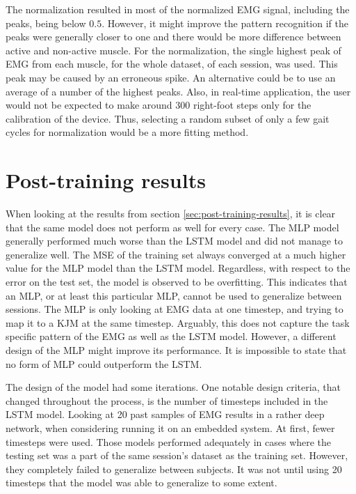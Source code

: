 \documentclass[../main.tex]{subfiles}
\begin{document}
The normalization resulted in most of the normalized \ac{EMG} signal, including the peaks, being below $0.5$.
However, it might improve the pattern recognition if the peaks were generally closer to one and there would be more difference between active and non-active muscle.
For the normalization, the single highest peak of \ac{EMG} from each muscle, for the whole dataset, of each session, was used.
This peak may be caused by an erroneous spike.
An alternative could be to use an average of a number of the highest peaks.
Also, in real-time application, the user would not be expected to make around $300$ right-foot steps only for the calibration of the device.
Thus, selecting a random subset of only a few gait cycles for normalization would be a more fitting method.

\section{Post-training results}
\label{sec:discussion_post-training-results}
When looking at the results from section \ref{sec:post-training-results}, it is clear that the same model does not perform as well for every case.
The \ac{MLP} model generally performed much worse than the \ac{LSTM} model and did not manage to generalize well.
The \ac{MSE} of the training set always converged at a much higher value for the \ac{MLP} model than the \ac{LSTM} model.
Regardless, with respect to the error on the test set, the model is observed to be overfitting.
This indicates that an \ac{MLP}, or at least this particular \ac{MLP}, cannot be used to generalize between sessions.
The \ac{MLP} is only looking at \ac{EMG} data at one timestep, and trying to map it to a \ac{KJM} at the same timestep.
Arguably, this does not capture the task specific pattern of the \ac{EMG} as well as the \ac{LSTM} model.
However, a different design of the \ac{MLP} might improve its performance. 
It is impossible to state that no form of \ac{MLP} could outperform the \ac{LSTM}.

The design of the model had some iterations. 
One notable design criteria, that changed throughout the process, is the number of timesteps included in the \ac{LSTM} model.
Looking at 20 past samples of \ac{EMG} results in a rather deep network, when considering running it on an embedded system.
At first, fewer timesteps were used.
Those models performed adequately in cases where the testing set was a part of the same session's dataset as the training set.
However, they completely failed to generalize between subjects.
It was not until using 20 timesteps that the model was able to generalize to some extent.
\end{document}
